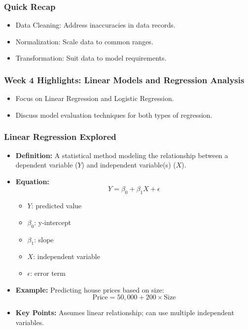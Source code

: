 \documentclass[aspectratio=169]{beamer}
\begin{document}
\begin{frame}[fragile]
    \frametitle{Quick Recap}
    \begin{itemize}
        \item Data Cleaning: Address inaccuracies in data records.
        \item Normalization: Scale data to common ranges.
        \item Transformation: Suit data to model requirements.
    \end{itemize}
\end{frame}

\begin{frame}[fragile]
    \frametitle{Week 4 Highlights: Linear Models and Regression Analysis}
    \begin{itemize}
        \item Focus on Linear Regression and Logistic Regression.
        \item Discuss model evaluation techniques for both types of regression.
    \end{itemize}
\end{frame}

\begin{frame}[fragile]
    \frametitle{Linear Regression Explored}
    \begin{itemize}
        \item \textbf{Definition:} A statistical method modeling the relationship between a dependent variable (\(Y\)) and independent variable(s) (\(X\)).
        \item \textbf{Equation:}
        \begin{equation}
        Y = \beta_0 + \beta_1X + \epsilon
        \end{equation}
        \begin{itemize}
            \item \(Y\): predicted value
            \item \(\beta_0\): y-intercept
            \item \(\beta_1\): slope
            \item \(X\): independent variable
            \item \(\epsilon\): error term
        \end{itemize}
        \item \textbf{Example:} Predicting house prices based on size:
        \begin{equation}
        \text{Price} = 50,000 + 200 \times \text{Size}
        \end{equation}
        \item \textbf{Key Points:} Assumes linear relationship; can use multiple independent variables.
    \end{itemize}
\end{frame}
\end{document}
